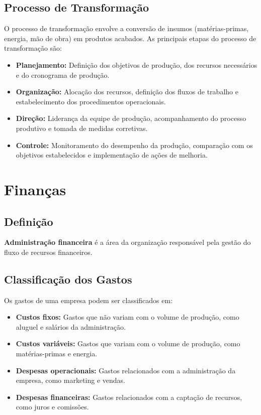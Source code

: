 \documentclass{article}
\begin{document}
\subsection{Processo de Transformação}
O processo de transformação envolve a conversão de insumos (matérias-primas, energia, mão de obra) em produtos acabados. As principais etapas do processo de transformação são:
\begin{itemize}
    \item \textbf{Planejamento:} Definição dos objetivos de produção, dos recursos necessários e do cronograma de produção.
    \item \textbf{Organização:} Alocação dos recursos, definição dos fluxos de trabalho e estabelecimento dos procedimentos operacionais.
    \item \textbf{Direção:} Liderança da equipe de produção, acompanhamento do processo produtivo e tomada de medidas corretivas.
    \item \textbf{Controle:} Monitoramento do desempenho da produção, comparação com os objetivos estabelecidos e implementação de ações de melhoria.
\end{itemize}

\section{Finanças}

\subsection{Definição}
\textbf{Administração financeira} é a área da organização responsável pela gestão do fluxo de recursos financeiros.

\subsection{Classificação dos Gastos}
Os gastos de uma empresa podem ser classificados em:
\begin{itemize}
    \item \textbf{Custos fixos:} Gastos que não variam com o volume de produção, como aluguel e salários da administração.
    \item \textbf{Custos variáveis:} Gastos que variam com o volume de produção, como matérias-primas e energia.
    \item \textbf{Despesas operacionais:} Gastos relacionados com a administração da empresa, como marketing e vendas.
    \item \textbf{Despesas financeiras:} Gastos relacionados com a captação de recursos, como juros e comissões.
\end{itemize}
\end{document}
